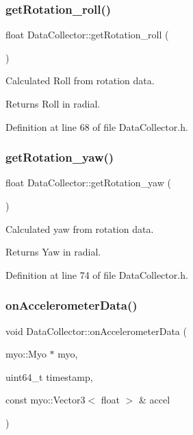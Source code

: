 \subsubsection{\texorpdfstring{get\+Rotation\+\_\+roll()}{getRotation\_roll()}}
{\footnotesize\ttfamily float Data\+Collector\+::get\+Rotation\+\_\+roll (\begin{DoxyParamCaption}{ }\end{DoxyParamCaption})\hspace{0.3cm}{\ttfamily [inline]}}



Calculated Roll from rotation data. 

\begin{DoxyReturn}{Returns}
Roll in radial. 
\end{DoxyReturn}


Definition at line 68 of file Data\+Collector.\+h.

\mbox{\label{class_data_collector_a45175c5352dd3870c2d1cf99c4b2d938}} 
\subsubsection{\texorpdfstring{get\+Rotation\+\_\+yaw()}{getRotation\_yaw()}}
{\footnotesize\ttfamily float Data\+Collector\+::get\+Rotation\+\_\+yaw (\begin{DoxyParamCaption}{ }\end{DoxyParamCaption})\hspace{0.3cm}{\ttfamily [inline]}}



Calculated yaw from rotation data. 

\begin{DoxyReturn}{Returns}
Yaw in radial. 
\end{DoxyReturn}


Definition at line 74 of file Data\+Collector.\+h.

\mbox{\label{class_data_collector_af284c1bda701eb04d8278848672a1be6}} 
\subsubsection{\texorpdfstring{on\+Accelerometer\+Data()}{onAccelerometerData()}}
{\footnotesize\ttfamily void Data\+Collector\+::on\+Accelerometer\+Data (\begin{DoxyParamCaption}\item[{myo\+::\+Myo $\ast$}]{myo,  }\item[{uint64\+\_\+t}]{timestamp,  }\item[{const myo\+::\+Vector3$<$ float $>$ \&}]{accel }\end{DoxyParamCaption})}



